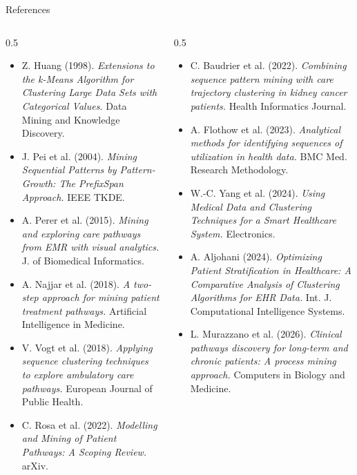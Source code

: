 \documentclass[aspectratio=169,11pt]{beamer}
\begin{document}
\begin{frame}{References}
  \scriptsize
  \begin{columns}[T]
    \begin{column}{0.5\textwidth}
      \begin{itemize}\setlength{\itemsep}{0.3em}
        \item Z. Huang (1998). \textit{Extensions to the k-Means Algorithm for Clustering Large Data Sets with Categorical Values.} Data Mining and Knowledge Discovery.
        \item J. Pei et al. (2004). \textit{Mining Sequential Patterns by Pattern-Growth: The PrefixSpan Approach.} IEEE TKDE.
        \item A. Perer et al. (2015). \textit{Mining and exploring care pathways from EMR with visual analytics.} J. of Biomedical Informatics.
        \item A. Najjar et al. (2018). \textit{A two-step approach for mining patient treatment pathways.} Artificial Intelligence in Medicine.
        \item V. Vogt et al. (2018). \textit{Applying sequence clustering techniques to explore ambulatory care pathways.} European Journal of Public Health.
        \item C. Rosa et al. (2022). \textit{Modelling and Mining of Patient Pathways: A Scoping Review.} arXiv.
      \end{itemize}
    \end{column}
    \begin{column}{0.5\textwidth}
      \begin{itemize}\setlength{\itemsep}{0.3em}
        \item C. Baudrier et al. (2022). \textit{Combining sequence pattern mining with care trajectory clustering in kidney cancer patients.} Health Informatics Journal.
        \item A. Flothow et al. (2023). \textit{Analytical methods for identifying sequences of utilization in health data.} BMC Med. Research Methodology.
        \item W.-C. Yang et al. (2024). \textit{Using Medical Data and Clustering Techniques for a Smart Healthcare System.} Electronics.
        \item A. Aljohani (2024). \textit{Optimizing Patient Stratification in Healthcare: A Comparative Analysis of Clustering Algorithms for EHR Data.} Int. J. Computational Intelligence Systems.
        \item L. Murazzano et al. (2026). \textit{Clinical pathways discovery for long-term and chronic patients: A process mining approach.} Computers in Biology and Medicine.
      \end{itemize}
    \end{column}
  \end{columns}
\end{frame}
\end{document}
